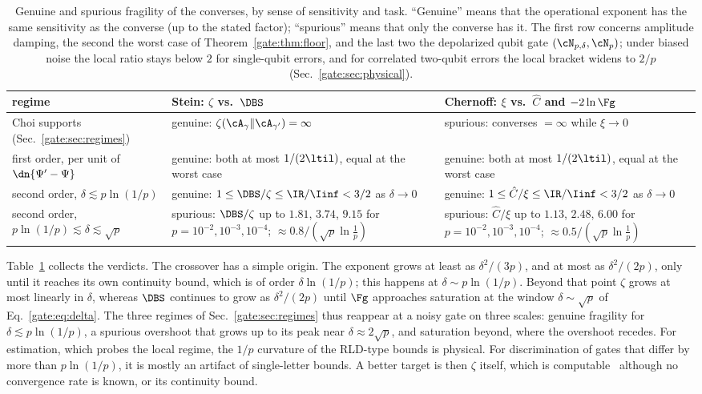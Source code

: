 \begin{table}[!tbp]
\centering
\small
\caption{Genuine and spurious fragility of the converses, by sense of sensitivity and task. ``Genuine'' means that the operational exponent has the same sensitivity as the converse (up to the stated factor); ``spurious'' means that only the converse has it. The first row concerns amplitude damping, the second the worst case of Theorem~\ref{gate:thm:floor}, and the last two the depolarized qubit gate $(\cN_{p,\delta},\cN_p)$; under biased noise the local ratio stays below $2$ for single-qubit errors, and for correlated two-qubit errors the local bracket widens to $2/p$ (Sec.~\ref{gate:sec:physical}).}
\label{gate:tab:verdict}
\begin{tabular}{p{}p{}p{}}
\toprule
regime & Stein: $\zeta$ vs.\ $\DBS$ & Chernoff: $\xi$ vs.\ $\hat C$ and $-2\ln\Fg$\\
\midrule
Choi supports (Sec.~\ref{gate:sec:regimes}) & genuine: $\zeta(\cA_\gamma\|\cA_{\gamma'})=\infty$ & spurious: converses $=\infty$ while $\xi\to0$\\
first order, per unit of $\dn{\Psi'-\Psi}$ & genuine: both at most $1/(2\ltil)$, equal at the worst case & genuine: both at most $1/(2\ltil)$, equal at the worst case\\
second order, $\delta\lesssim p\ln(1/p)$ & genuine: $1\le\DBS/\zeta\le\IR/\Iinf<3/2$ as $\delta\to0$ & genuine: $1\le\hat C/\xi\le\IR/\Iinf<3/2$ as $\delta\to0$\\
second order, $p\ln(1/p)\lesssim\delta\lesssim\sqrt p$ & spurious: $\DBS/\zeta$ up to $1.81$, $3.74$, $9.15$ for $p=10^{-2},10^{-3},10^{-4}$; $\approx0.8/(\sqrt p\ln\frac1p)$ & spurious: $\hat C/\xi$ up to $1.13$, $2.48$, $6.00$ for $p=10^{-2},10^{-3},10^{-4}$; $\approx0.5/(\sqrt p\ln\frac1p)$\\
\bottomrule
\end{tabular}
\end{table}

Table~\ref{gate:tab:verdict} collects the verdicts. The crossover has a simple origin. The exponent grows at least as $\delta^2/(3p)$, and at most as $\delta^2/(2p)$, only until it reaches its own continuity bound, which is of order $\delta\ln(1/p)$; this happens at $\delta\sim p\ln(1/p)$. Beyond that point $\zeta$ grows at most linearly in $\delta$, whereas $\DBS$ continues to grow as $\delta^2/(2p)$ until $\Fg$ approaches saturation at the window $\delta\sim\sqrt p$ of Eq.~\eqref{gate:eq:delta}. The three regimes of Sec.~\ref{gate:sec:regimes} thus reappear at a noisy gate on three scales: genuine fragility for $\delta\lesssim p\ln(1/p)$, a spurious overshoot that grows up to its peak near $\delta\approx2\sqrt p$, and saturation beyond, where the overshoot recedes. For estimation, which probes the local regime, the $1/p$ curvature of the RLD-type bounds is physical. For discrimination of gates that differ by more than $p\ln(1/p)$, it is mostly an artifact of single-letter bounds. A better target is then $\zeta$ itself, which is computable~\cite{SchmittSutter2026,WangYang2026} although no convergence rate is known, or its continuity bound.


